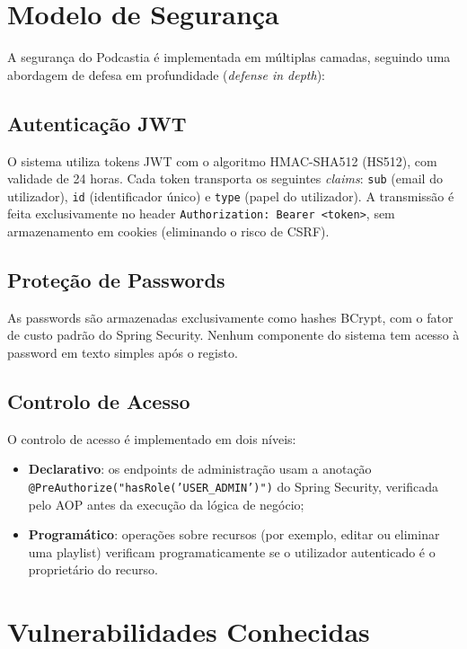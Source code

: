\documentclass[12pt, a4paper]{report}
\begin{document}
\section{Modelo de Segurança}

A segurança do Podcastia é implementada em múltiplas camadas, seguindo uma
abordagem de defesa em profundidade (\emph{defense in depth}):

\subsection{Autenticação JWT}

O sistema utiliza tokens JWT com o algoritmo HMAC-SHA512 (HS512), com validade
de 24 horas. Cada token transporta os seguintes \emph{claims}: \texttt{sub}
(email do utilizador), \texttt{id} (identificador único) e \texttt{type}
(papel do utilizador). A transmissão é feita exclusivamente no header
\texttt{Authorization: Bearer <token>}, sem armazenamento em cookies (eliminando
o risco de CSRF).

\subsection{Proteção de Passwords}

As passwords são armazenadas exclusivamente como hashes BCrypt, com o fator de
custo padrão do Spring Security. Nenhum componente do sistema tem acesso à
password em texto simples após o registo.

\subsection{Controlo de Acesso}

O controlo de acesso é implementado em dois níveis:
\begin{itemize}
  \item \textbf{Declarativo}: os endpoints de administração usam a anotação \texttt{@PreAuthorize("hasRole('USER\_ADMIN')")} do Spring Security, verificada pelo AOP antes da execução da lógica de negócio;
  \item \textbf{Programático}: operações sobre recursos (por exemplo, editar ou eliminar uma playlist) verificam programaticamente se o utilizador autenticado é o proprietário do recurso.
\end{itemize}

\section{Vulnerabilidades Conhecidas}
\end{document}
